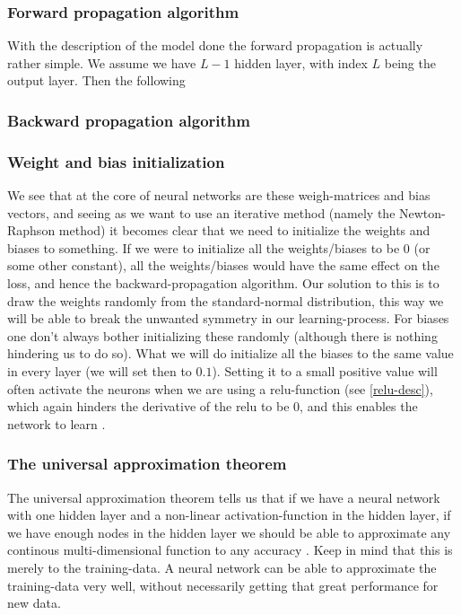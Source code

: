 \documentclass{article}
\begin{document}
\subsubsection{Forward propagation algorithm}
With the description of the model done the forward propagation is actually
rather simple. We assume we have $L-1$ hidden layer, with index $L$ being the output layer. Then the following

\subsubsection{Backward propagation algorithm}

\subsubsection{Weight and bias initialization}
We see that at the core of neural networks are these weigh-matrices and bias
vectors, and seeing as we want to use an iterative method (namely the
Newton-Raphson method) it becomes clear that we need to initialize the weights
and biases to something. If we were to initialize all the weights/biases to be
$0$ (or some other constant), all the weights/biases would have the same effect
on the loss, and hence the backward-propagation algorithm. Our solution to this
is to draw the weights randomly from the standard-normal distribution, this way
we will be able to break the unwanted symmetry in our learning-process. For
biases one don't always bother initializing these randomly (although there is
nothing hindering us to do so). What we will do initialize all the biases to the
same value in every layer (we will set then to $0.1$). Setting it to a small
positive value will often activate the neurons when we are using a
relu-function (see \ref{relu-desc}), which again hinders the derivative of the
relu to be $0$, and this enables the network to learn
\cite[s.~6.3.1]{goodfellow2016deep}.

\subsubsection{The universal approximation theorem}
\label{univ-approx-thm}
The universal approximation theorem tells us that if we have a neural network
with one hidden layer and a non-linear activation-function in the hidden layer,
if we have enough nodes in the hidden layer we should be able to approximate any
continous multi-dimensional function to any accuracy
\cite[s.~13.5]{lecutenotes13}. Keep in mind that this is merely to the
training-data. A neural network can be able to approximate the training-data
very well, without necessarily getting that great performance for new data.
\end{document}
